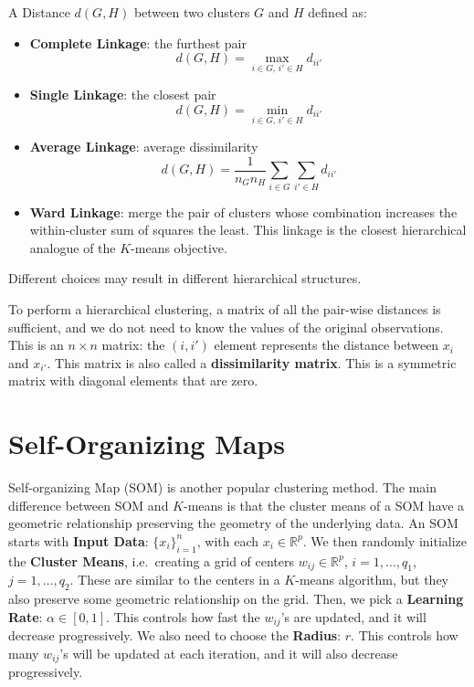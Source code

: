 \documentclass[
]{book}
\begin{document}
A Distance \(d(G, H)\) between two clusters \(G\) and \(H\) defined as:

\begin{itemize}
\item
  \textbf{Complete Linkage}: the furthest pair
  \[d(G, H) = \max_{i\in G,\, i'\in H} d_{ii'}\]
\item
  \textbf{Single Linkage}: the closest pair
  \[d(G, H) = \min_{i\in G,\, i'\in H} d_{ii'}\]
\item
  \textbf{Average Linkage}: average dissimilarity
  \[d(G, H) = \frac{1}{n_G n_H} \sum_{i\in G} \sum_{i'\in H} d_{ii'}\]
\item
  \textbf{Ward Linkage}: merge the pair of clusters whose combination increases the within-cluster sum of squares the least. This linkage is the closest hierarchical analogue of the \(K\)-means objective.
\end{itemize}

Different choices may result in different hierarchical structures.

To perform a hierarchical clustering, a matrix of all the pair-wise distances is sufficient, and we do not need to know the values of the original observations. This is an \(n \times n\) matrix: the \((i, i')\) element represents the distance between \(x_i\) and \(x_{i'}\). This matrix is also called a \textbf{dissimilarity matrix}. This is a symmetric matrix with diagonal elements that are zero.

\section{Self-Organizing Maps}\label{self-organizing-maps}

Self-organizing Map (SOM) is another popular clustering method. The main difference between SOM and \(K\)-means is that the cluster means of a SOM have a geometric relationship preserving the geometry of the underlying data. An SOM starts with \textbf{Input Data}: \(\{x_i\}_{i=1}^{n}\), with each \(x_i \in \mathbb{R}^{p}\). We then randomly initialize the \textbf{Cluster Means}, i.e.~creating a grid of centers \(w_{ij} \in \mathbb{R}^{p}\), \(i=1, \ldots, q_1\), \(j=1,\ldots, q_2\). These are similar to the centers in a \(K\)-means algorithm, but they also preserve some geometric relationship on the grid. Then, we pick a \textbf{Learning Rate}: \(\alpha \in[0,1]\). This controls how fast the \(w_{ij}\)'s are updated, and it will decrease progressively. We also need to choose the \textbf{Radius}: \(r\). This controls how many \(w_{ij}\)'s will be updated at each
iteration, and it will also decrease progressively.
\end{document}
